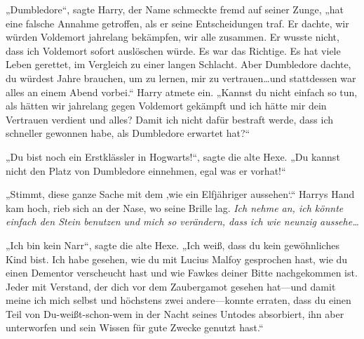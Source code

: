 „Dumbledore“, sagte Harry, der Name schmeckte fremd auf seiner Zunge, „hat eine falsche Annahme getroffen, als er seine Entscheidungen traf. Er dachte, wir würden Voldemort jahrelang bekämpfen, wir alle zusammen. Er wusste nicht, dass ich Voldemort sofort auslöschen würde. Es war das Richtige. Es hat viele Leben gerettet, im Vergleich zu einer langen Schlacht. Aber Dumbledore dachte, du würdest Jahre brauchen, um zu lernen, mir zu vertrauen…und stattdessen war alles an einem Abend vorbei.“
Harry atmete ein.
„Kannst du nicht einfach so tun, als hätten wir jahrelang gegen Voldemort gekämpft und ich hätte mir dein Vertrauen verdient und alles? Damit ich nicht dafür bestraft werde, dass ich schneller gewonnen habe, als Dumbledore erwartet hat?“

„Du bist noch ein Erstklässler in Hogwarts!“, sagte die alte Hexe. „Du kannst nicht den Platz von Dumbledore einnehmen, egal was er vorhat!“

„Stimmt, diese ganze Sache mit dem ‚wie ein Elfjähriger aussehen‘.“
Harrys Hand kam hoch, rieb sich an der Nase, wo seine Brille lag.
\emph{Ich nehme an, ich könnte einfach den Stein benutzen und mich so verändern, dass ich wie neunzig aussehe…}

„Ich bin kein Narr“, sagte die alte Hexe. „Ich weiß, dass du kein gewöhnliches Kind bist. Ich habe gesehen, wie du mit Lucius Malfoy gesprochen hast, wie du einen Dementor verscheucht hast und wie Fawkes deiner Bitte nachgekommen ist. Jeder mit Verstand, der dich vor dem Zaubergamot gesehen hat—und damit meine ich mich selbst und höchstens zwei andere—konnte erraten, dass du einen Teil von Du-weißt-schon-wem in der Nacht seines Untodes absorbiert, ihn aber unterworfen und sein Wissen für gute Zwecke genutzt hast.“

